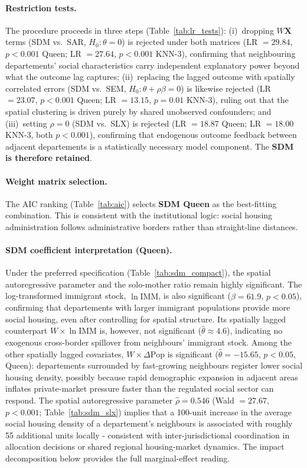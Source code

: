 \documentclass[a4paper,12pt]{article}
\begin{document}
\paragraph{Restriction tests.}
The procedure proceeds in three steps (Table~\ref{tab:lr_tests}): (i)~dropping $W\!\mathbf{X}$ terms (SDM vs.\ SAR, $H_0\colon\theta = 0$) is rejected under both matrices (LR $= 29.84$, $p < 0.001$ Queen; LR $= 27.64$, $p < 0.001$ KNN-3), confirming that neighbouring departements' social characteristics carry independent explanatory power beyond what the outcome lag captures; (ii)~replacing the lagged outcome with spatially correlated errors (SDM vs.\ SEM, $H_0\colon\theta + \rho\beta = 0$) is likewise rejected (LR $= 23.07$, $p < 0.001$ Queen; LR $= 13.15$, $p = 0.01$ KNN-3), ruling out that the spatial clustering is driven purely by shared unobserved confounders; and (iii)~setting $\rho = 0$ (SDM vs.\ SLX) is rejected (LR $= 18.87$ Queen; LR $= 18.00$ KNN-3, both $p < 0.001$), confirming that endogenous outcome feedback between adjacent departements is a statistically necessary model component. The \textbf{SDM is therefore retained}.

\paragraph{Weight matrix selection.}
The AIC ranking (Table~\ref{tab:aic}) selects \textbf{SDM Queen} as the best-fitting combination. This is consistent with the institutional logic: social housing administration follows administrative borders rather than straight-line distances.

\paragraph{SDM coefficient interpretation (Queen).}
Under the preferred specification (Table~\ref{tab:sdm_compact}), the spatial autoregressive parameter and the solo-mother ratio remain highly significant. The log-transformed immigrant stock, $\ln\mathrm{IMM}$, is also significant ($\hat{\beta} = 61.9$, $p < 0.05$), confirming that departements with larger immigrant populations provide more social housing, even after controlling for spatial structure. Its spatially lagged counterpart $W\!\times\!\ln\mathrm{IMM}$ is, however, not significant ($\hat{\theta} \approx 4.6$), indicating no exogenous cross-border spillover from neighbours' immigrant stock. Among the other spatially lagged covariates, $W\!\times\!\Delta\mathrm{Pop}$ is significant ($\hat{\theta} = -15.65$, $p < 0.05$, Queen): departements surrounded by fast-growing neighbours register lower social housing density, possibly because rapid demographic expansion in adjacent areas inflates private-market pressure faster than the regulated social sector can respond. The spatial autoregressive parameter $\hat{\rho} = 0.546$ (Wald $= 27.67$, $p < 0.001$; Table~\ref{tab:sdm_slx}) implies that a 100-unit increase in the average social housing density of a departement's neighbours is associated with roughly 55 additional units locally - consistent with inter-jurisdictional coordination in allocation decisions or shared regional housing-market dynamics. The impact decomposition below provides the full marginal-effect reading.
\end{document}
